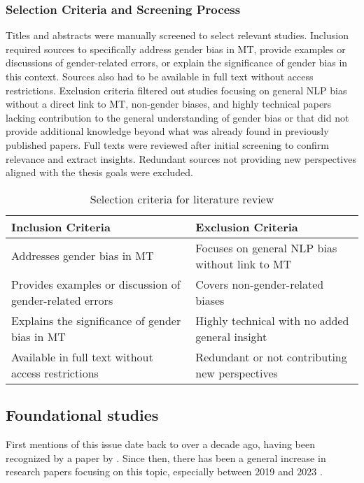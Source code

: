         \subsubsection{Selection Criteria and Screening Process}\label{subsection:selection_criteria}
        Titles and abstracts were manually screened to select relevant studies. Inclusion required sources to specifically address gender bias in MT, provide examples or discussions of gender-related errors, or explain the significance of gender bias in this context. Sources also had to be available in full text without access restrictions. Exclusion criteria filtered out studies focusing on general NLP bias without a direct link to MT, non-gender biases, and highly technical papers lacking contribution to the general understanding of gender bias or that did not provide additional knowledge beyond what was already found in previously published papers. Full texts were reviewed after initial screening to confirm relevance and extract insights. Redundant sources not providing new perspectives aligned with the thesis goals were excluded.
        
        \vspace{0.6em}
        \begin{table}[h]
            \centering
            \begin{tabularx}{\textwidth}{X X}
            \toprule
            \textbf{Inclusion Criteria} & \textbf{Exclusion Criteria} \\
            \midrule
            Addresses gender bias in MT & Focuses on general NLP bias without link to MT \\
            Provides examples or discussion of gender-related errors & Covers non-gender-related biases \\
            Explains the significance of gender bias in MT & Highly technical with no added general insight \\
            Available in full text without access restrictions & Redundant or not contributing new perspectives \\
            \bottomrule
            \end{tabularx}
            \caption{Selection criteria for literature review}
        \end{table}

    \subsection{Foundational studies}
        First mentions of this issue date back to over a decade ago, having been recognized by a paper by \textcite{schiebingerScientificResearchMust2014}. Since then, there has been a general increase in research papers focusing on this topic, especially between 2019 and 2023 \parencite{savoldiDecadeGenderBias2025}. 

